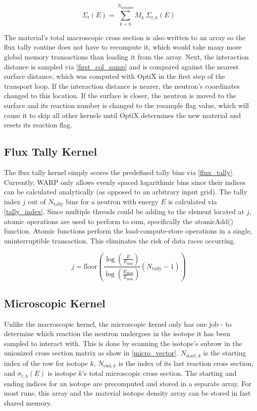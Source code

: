 \begin{equation}
\Sigma_t(E) = \sum_{k=0}^{N_\mathrm{isotopes}} M_k \: \Sigma_{t,k}(E)
\label{macro_vector}
\end{equation}

The material's total macroscopic cross section is also written to an array so the flux tally routine does not have to recompute it, which would take many more global memory transactions than loading it from the array.  Next, the interaction distance is sampled via \eqref{first_col_samp} and is compared against the nearest surface distance, which was computed with OptiX in the first step of the transport loop.  If the interaction distance is nearer, the neutron's coordinates changed to this location.  If the surface is closer, the neutron is moved to the surface and its reaction number is changed to the resample flag value, which will cause it to skip all other kernels until OptiX determines the new material and resets its reaction flag.

\subsection{Flux Tally Kernel}

The flux tally kernel simply scores the predefined tally bins via \eqref{flux_tally}.  Currently, WARP only allows evenly spaced logarithmic bins since their indices can be calculated analytically (as opposed to an arbitrary input grid).  The tally index $j$ out of $N_\mathrm{tally}$ bins for a neutron with energy $E$ is calculated via \eqref{tally_index}.  Since multiple threads could be adding to the element located at $j$, atomic operations are used to perform to sum, specifically the atomicAdd() function.  Atomic functions perform the load-compute-store operations in a single, uninterruptible transaction.  This eliminates the risk of data races occurring.

\begin{equation}
j = \mathrm{floor} \left( \frac{ \log \left( \frac{E}{E_\mathrm{min}} \right)} { \log \left( \frac{E_\mathrm{max}}{E_\mathrm{min}} \right)} (N_\mathrm{tally}-1) \right)
\label{tally_index}
\end{equation}

\subsection{Microscopic Kernel}

Unlike the macroscopic kernel, the microscopic kernel only has one job - to determine which reaction the neutron undergoes in the isotope it has been sampled to interact with.  This is done by scanning the isotope's subrow in the unionized cross section matrix as show in \eqref{micro_vector}.  $N_{\mathrm{start},k}$ is the starting index of the row for isotope $k$, $N_{\mathrm{end},k}$ is the index of its last reaction cross section, and $\sigma_{t,k}(E)$ is isotope $k$'s total microscopic cross section.  The starting and ending indices for an isotope are precomputed and stored in a separate array.  For most runs, this array and the material isotope density array can be stored in fast shared memory.

